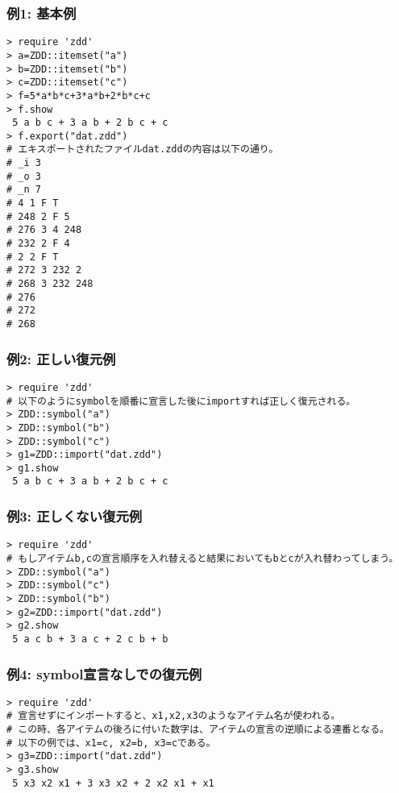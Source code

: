 \subsubsection*{例1: 基本例}



\begin{Verbatim}[baselinestretch=0.7,frame=single]
> require 'zdd'
> a=ZDD::itemset("a")
> b=ZDD::itemset("b")
> c=ZDD::itemset("c")
> f=5*a*b*c+3*a*b+2*b*c+c
> f.show
 5 a b c + 3 a b + 2 b c + c
> f.export("dat.zdd")
# エキスポートされたファイルdat.zddの内容は以下の通り。
# _i 3
# _o 3
# _n 7
# 4 1 F T
# 248 2 F 5
# 276 3 4 248
# 232 2 F 4
# 2 2 F T
# 272 3 232 2
# 268 3 232 248
# 276
# 272
# 268

\end{Verbatim}
\subsubsection*{例2: 正しい復元例}



\begin{Verbatim}[baselinestretch=0.7,frame=single]
> require 'zdd'
# 以下のようにsymbolを順番に宣言した後にimportすれば正しく復元される。
> ZDD::symbol("a")
> ZDD::symbol("b")
> ZDD::symbol("c")
> g1=ZDD::import("dat.zdd")
> g1.show
 5 a b c + 3 a b + 2 b c + c
\end{Verbatim}
\subsubsection*{例3: 正しくない復元例}



\begin{Verbatim}[baselinestretch=0.7,frame=single]
> require 'zdd'
# もしアイテムb,cの宣言順序を入れ替えると結果においてもbとcが入れ替わってしまう。
> ZDD::symbol("a")
> ZDD::symbol("c")
> ZDD::symbol("b")
> g2=ZDD::import("dat.zdd")
> g2.show
 5 a c b + 3 a c + 2 c b + b
\end{Verbatim}
\subsubsection*{例4: symbol宣言なしでの復元例}



\begin{Verbatim}[baselinestretch=0.7,frame=single]
> require 'zdd'
# 宣言せずにインポートすると、x1,x2,x3のようなアイテム名が使われる。
# この時、各アイテムの後ろに付いた数字は、アイテムの宣言の逆順による連番となる。
# 以下の例では、x1=c, x2=b, x3=cである。
> g3=ZDD::import("dat.zdd")
> g3.show
 5 x3 x2 x1 + 3 x3 x2 + 2 x2 x1 + x1
\end{Verbatim}
